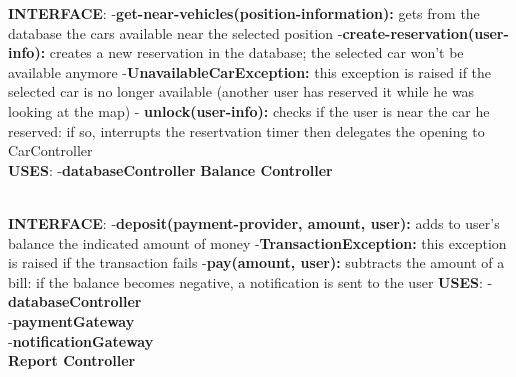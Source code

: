 \documentclass{article}
\begin{document}
\textbf{INTERFACE}: 
 \newline
-\textbf{get-near-vehicles(position-information):} gets from the database the cars available near the selected position 
\newline
-\textbf{create-reservation(user-info):} creates a new reservation in the database; the selected car won't be available anymore
\newline
-\textbf{UnavailableCarException:} this exception is raised if the selected car is no longer available (another user has reserved it while he was looking at the map)  
\newline 
- \textbf{unlock(user-info):} checks if the user is near the car he reserved: if so, interrupts the resertvation timer then delegates the opening to CarController
\\
\textbf{USES}:   
\newline
-\textbf{databaseController}
\newpage
\textbf{Balance Controller}\\
\begin{figure}[ht]
\end{figure}\\
\textbf{INTERFACE}: 
 \newline
-\textbf{deposit(payment-provider, amount, user):} adds to user's balance the indicated amount of money
\newline
-\textbf{TransactionException:} this exception is raised if the transaction fails 
\newline
-\textbf{pay(amount, user):} subtracts the amount of a bill: if the balance becomes negative, a notification is sent to the user
\newline
\textbf{USES}:   
\newline
-\textbf{databaseController}
\\
-\textbf{paymentGateway}
\\
-\textbf{notificationGateway}
\\
\newpage
\textbf{Report Controller}\\
\begin{figure}[ht]
\end{figure}\\
\end{document}

